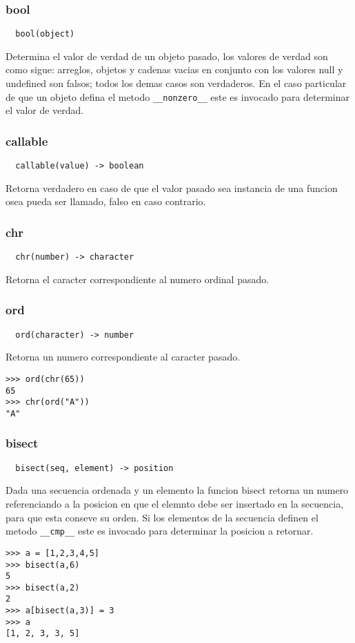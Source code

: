 \subsubsection*{bool}
\begin{verbatim}
  bool(object)
\end{verbatim}
Determina el valor de verdad de un objeto pasado, los valores de verdad son como
sigue: arreglos, objetos y cadenas vacias en conjunto con los valores null y
undefined son falsos; todos los demas casos son verdaderos.
En el caso particular de que un objeto defina el metodo \verb|__nonzero__| este es
invocado para determinar el valor de verdad.

\subsubsection*{callable}
\begin{verbatim}
  callable(value) -> boolean
\end{verbatim}
Retorna verdadero en caso de que el valor pasado sea instancia de una funcion
osea pueda ser llamado, falso en caso contrario.

\subsubsection*{chr}
\begin{verbatim}
  chr(number) -> character
\end{verbatim}
Retorna el caracter correspondiente al numero ordinal pasado.

\subsubsection*{ord}
\begin{verbatim}
  ord(character) -> number
\end{verbatim}
Retorna un numero correspondiente al caracter pasado.
\begin{lstlisting}[style=consola]
>>> ord(chr(65))
65
>>> chr(ord("A"))
"A"
\end{lstlisting}

\subsubsection*{bisect}
\begin{verbatim}
  bisect(seq, element) -> position
\end{verbatim}
Dada una secuencia ordenada y un elemento la funcion bisect retorna un numero referenciando a la posicion en que el elemnto debe ser insertado en la secuencia, para que esta conseve su orden.
Si los elementos de la secuencia definen el metodo \verb|__cmp__| este es invocado para determinar la posicion a retornar.
\begin{lstlisting}[style=consola]
>>> a = [1,2,3,4,5]
>>> bisect(a,6)
5
>>> bisect(a,2)
2
>>> a[bisect(a,3)] = 3
>>> a
[1, 2, 3, 3, 5]
\end{lstlisting}

